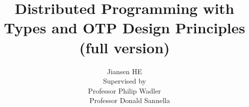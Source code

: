 \documentclass[coverpage]{myproposal}
\begin{document}
\title{Distributed Programming with Types and OTP Design Principles (full version)}
\author{ \hspace{2.8 cm} Jiansen HE \newline \\  Supervised by\\ Professor Philip Wadler \\ \ \ \ Professor Donald Sannella}
\maketitle
\tableofcontents








\appendix





\end{document}
